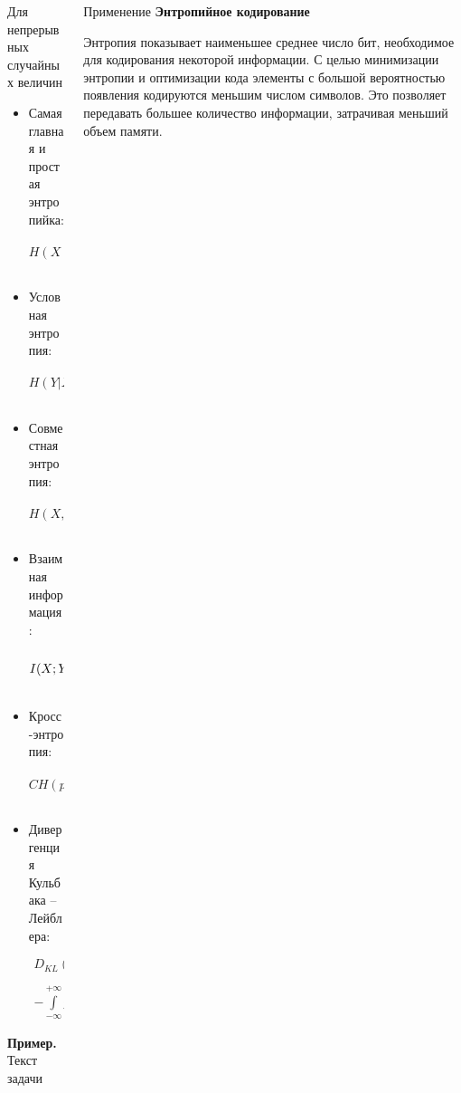 \documentclass[final]{beamer}
\newlength{\onecolwid}
\newlength{\twocolwid}
\begin{document}
\begin{frame}[t]
\begin{columns}[t]
\begin{column}{\twocolwid}
\begin{columns}[t,totalwidth=\twocolwid]
\begin{column}{\onecolwid}
\begin{block}{Для непрерывных случайных величин}

\begin{itemize}
	\item Самая главная и простая энтропийка:
	\[H(X)=-\int\limits_{-\infty}^{+\infty} f(x)\log f(x)dx \]
	\item Условная энтропия:
	\[H(Y|X)=-\int\limits_{-\infty}^{+\infty} f(x, y)\log f_{Y|X}(y)dy \]
	\item Совместная энтропия:
	\[H(X, Y)=-\int\limits_{-\infty}^{+\infty} \int\limits_{-\infty}^{+\infty} f(x, y)\log f(x, y)dxdy \]
	\item Взаимная информация:
	\[I(X; Y)=\int\limits_{-\infty}^{+\infty} \int\limits_{-\infty}^{+\infty} f(x, y) \log \cfrac{f(x, y)}{f(x)f(y)}dxdy \]
	\item Кросс-энтропия:
	\[CH(p, q)=-\int\limits_{-\infty}^{+\infty}p(x)\log q(x) dx \]
	\item Дивергенция Кульбака -- Лейблера:
	\begin{multline*}
		D_{KL}(P\, ||\, Q)=\int\limits_{-\infty}^{+\infty} p(x)\log p(x)dx - \\ -\int\limits_{-\infty}^{+\infty} p(x)\log q(x)dx
	\end{multline*}
\end{itemize}

\textbf{Пример.} Текст задачи
\end{block}


\end{column} %

\begin{column}{\onecolwid}\vspace{-.6in} %


\begin{block}{Применение}
\textbf{Энтропийное кодирование}


Энтропия показывает наименьшее среднее число бит, необходимое для кодирования некоторой информации. С целью минимизации энтропии и оптимизации кода элементы с большой вероятностью появления кодируются меньшим числом символов. Это позволяет передавать большее количество информации, затрачивая меньший объем памяти.


\end{block}
\end{column}
\end{columns}
\end{column}
\end{columns}
\end{frame}
\end{document}

